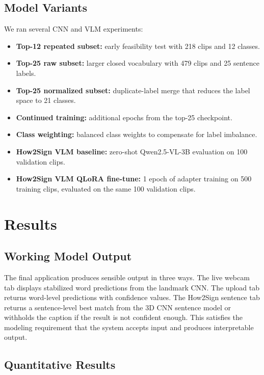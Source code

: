 \documentclass[10pt,twocolumn,letterpaper]{article}
\begin{document}
\subsection{Model Variants}

We ran several CNN and VLM experiments:
\begin{itemize}
    \item \textbf{Top-12 repeated subset:} early feasibility test with 218 clips and 12 classes.
    \item \textbf{Top-25 raw subset:} larger closed vocabulary with 479 clips and 25 sentence labels.
    \item \textbf{Top-25 normalized subset:} duplicate-label merge that reduces the label space to 21 classes.
    \item \textbf{Continued training:} additional epochs from the top-25 checkpoint.
    \item \textbf{Class weighting:} balanced class weights to compensate for label imbalance.
    \item \textbf{How2Sign VLM baseline:} zero-shot Qwen2.5-VL-3B evaluation on 100 validation clips.
    \item \textbf{How2Sign VLM QLoRA fine-tune:} 1 epoch of adapter training on 500 training clips, evaluated on the same 100 validation clips.
\end{itemize}

\section{Results}

\subsection{Working Model Output}

The final application produces sensible output in three ways. The live webcam tab displays stabilized word predictions from the landmark CNN. The upload tab returns word-level predictions with confidence values. The How2Sign sentence tab returns a sentence-level best match from the 3D CNN sentence model or withholds the caption if the result is not confident enough. This satisfies the modeling requirement that the system accepts input and produces interpretable output.

\subsection{Quantitative Results}
\end{document}
